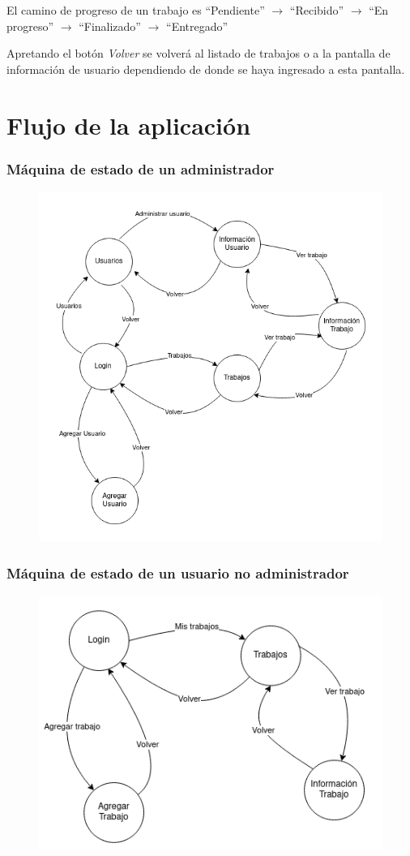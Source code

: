 \documentclass{article}
\begin{document}
El camino de progreso de un trabajo es ``Pendiente'' $\rightarrow$ ``Recibido'' $\rightarrow$ ``En progreso'' $\rightarrow$ ``Finalizado'' $\rightarrow$ ``Entregado''

Apretando el botón \emph{Volver} se volverá al listado de trabajos o a la pantalla de información de usuario dependiendo de donde se haya ingresado a esta pantalla.

\newpage

\section{Flujo de la aplicación}

\subsubsection*{Máquina de estado de un administrador}
\begin{figure}[h]
    \centering
    \includegraphics[width=0.7\linewidth,keepaspectratio]{admin-state-machine.png}
\end{figure}

\subsubsection*{Máquina de estado de un usuario no administrador}
\begin{figure}[h]
    \centering
    \includegraphics[width=0.6\linewidth,keepaspectratio]{user-state-machine.png}
\end{figure}
\end{document}
